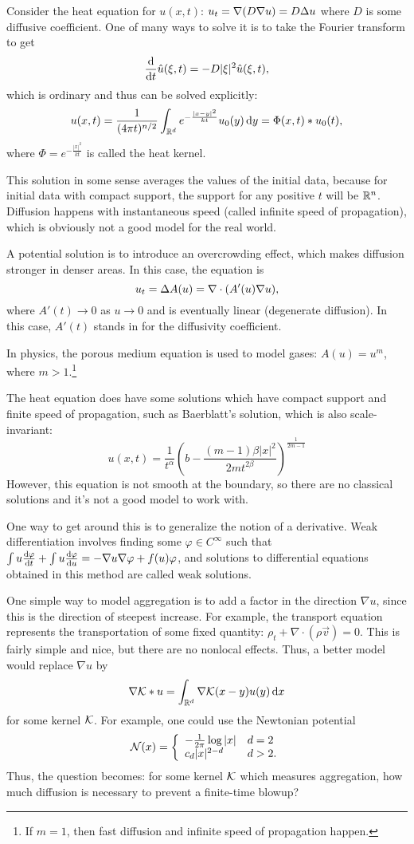 Consider the heat equation for $u(x,t)$: $u_t = \nabla(D\nabla u) = D\Delta u$ where $D$ is some diffusive coefficient. One of many ways to solve it is to take the Fourier transform to get
\[\frac{\mathrm{d} }{\mathrm{d} t} \hat u(\xi,t) = -D|\xi|^2\hat u(\xi,t),\] which is ordinary and thus can be solved explicitly:
\[u(x,t) = \frac{1}{(4\pi t)^{n/2}}\int_{\mathbb{R}^d} e^{-\frac{|x-y|^2}{kt}} u_0(y)\,\mathrm{d} y = \Phi(x,t) * u_0(t),\]
where $\Phi = e^{-\frac{|x|^2}{kt}}$ is called the heat kernel.

This solution in some sense averages the values of the initial data, because for initial data with compact support, the support for any positive $t$ will be $\mathbb{R}^n$. Diffusion happens with instantaneous speed (called infinite speed of propagation), which is obviously not a good model for the real world.

A potential solution is to introduce an overcrowding effect, which makes diffusion stronger in denser areas. In this case, the equation is
\[u_t = \Delta A(u) = \nabla\cdot(A'(u)\nabla u),\] where $A'(t) \to 0$ as $u\to 0$ and is eventually linear (degenerate diffusion). In this case, $A'(t)$ stands in for the diffusivity coefficient.

In physics, the porous medium equation is used to model gases: $A(u) = u^m$, where $m> 1$.\footnote{If $m = 1$, then fast diffusion and infinite speed of propagation happen.}

The heat equation does have some solutions which have compact support and finite speed of propagation, such as Baerblatt's solution, which is also scale-invariant:
\[u(x,t) = \frac{1}{t^\alpha} \left(b - \frac{(m-1)\beta|x|^2}{2mt^{2\beta}}\right)^{\frac{1}{2m-1}}\]
However, this equation is not smooth at the boundary, so there are no classical solutions and it's not a good model to work with.

One way to get around this is to generalize the notion of a derivative. Weak differentiation involves finding some $\varphi\in C^\infty$ such that $\int u\frac{\mathrm{d} \varphi}{\mathrm{d} t} +\int u\frac{\mathrm{d} \varphi}{\mathrm{d} u} = -\nabla u\nabla \varphi +f(u)\varphi$, and solutions to differential equations obtained in this method are called weak solutions.

One simple way to model aggregation is to add a factor in the direction $\nabla u$, since this is the direction of steepest increase. For example, the transport equation represents the transportation of some fixed quantity: $\rho_t+\nabla \cdot(\rho\vec v) = 0$. This is fairly simple and nice, but there are no nonlocal effects. Thus, a better model would replace $\nabla u$ by
\[\nabla \mathcal K*u =\int_{\mathbb{R}^d}\nabla\mathcal K(x-y)u(y)\,\mathrm{d} x\] for some kernel $\mathcal K$. For example, one could use the Newtonian potential
\[\mathcal{N}(x) =\left\{
\begin{array}{l l}
-\frac{1}{2\pi}\log|x| & d = 2\\
c_d|x|^{2-d} & d > 2.
\end{array}
\right.\]
Thus, the question becomes: for some kernel $\mathcal K$ which measures aggregation, how much diffusion is necessary to prevent a finite-time blowup?


